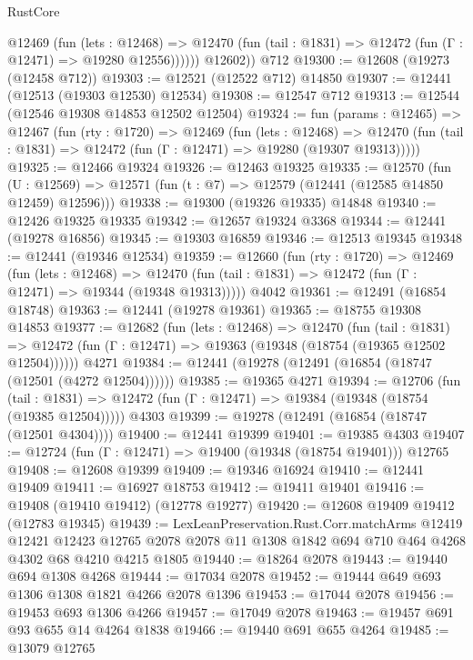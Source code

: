 \begin{lexlean}{RustCore}
\begin{coremodule}
            @12469
              (fun (lets : @12468) =>
              @12470 (fun (tail : @1831) => @12472 (fun (Γ : @12471) => @19280 @12556))))))
        @12602))
    @712
@19300 := @12608 (@19273 (@12458 @712))
@19303 := @12521 (@12522 @712) @14850
@19307 := @12441 (@12513 (@19303 @12530) @12534)
@19308 := @12547 @712
@19313 := @12544 (@12546 @19308 @14853 @12502 @12504)
@19324 := fun (params : @12465) =>
  @12467
    (fun (rty : @1720) =>
    @12469
      (fun (lets : @12468) =>
      @12470 (fun (tail : @1831) => @12472 (fun (Γ : @12471) => @19280 (@19307 @19313)))))
@19325 := @12466 @19324
@19326 := @12463 @19325
@19335 := @12570
    (fun (U : @12569) => @12571 (fun (t : @7) => @12579 (@12441 (@12585 @14850 @12459) @12596)))
@19338 := @19300 (@19326 @19335) @14848
@19340 := @12426 @19325 @19335
@19342 := @12657 @19324 @3368
@19344 := @12441 (@19278 @16856)
@19345 := @19303 @16859
@19346 := @12513 @19345
@19348 := @12441 (@19346 @12534)
@19359 := @12660
    (fun (rty : @1720) =>
    @12469
      (fun (lets : @12468) =>
      @12470 (fun (tail : @1831) => @12472 (fun (Γ : @12471) => @19344 (@19348 @19313)))))
    @4042
@19361 := @12491 (@16854 @18748)
@19363 := @12441 (@19278 @19361)
@19365 := @18755 @19308 @14853
@19377 := @12682
    (fun (lets : @12468) =>
    @12470
      (fun (tail : @1831) =>
      @12472 (fun (Γ : @12471) => @19363 (@19348 (@18754 (@19365 @12502 @12504))))))
    @4271
@19384 := @12441 (@19278 (@12491 (@16854 (@18747 (@12501 (@4272 @12504))))))
@19385 := @19365 @4271
@19394 := @12706
    (fun (tail : @1831) => @12472 (fun (Γ : @12471) => @19384 (@19348 (@18754 (@19385 @12504)))))
    @4303
@19399 := @19278 (@12491 (@16854 (@18747 (@12501 @4304))))
@19400 := @12441 @19399
@19401 := @19385 @4303
@19407 := @12724 (fun (Γ : @12471) => @19400 (@19348 (@18754 @19401))) @12765
@19408 := @12608 @19399
@19409 := @19346 @16924
@19410 := @12441 @19409
@19411 := @16927 @18753
@19412 := @19411 @19401
@19416 := @19408 (@19410 @19412) (@12778 @19277)
@19420 := @12608 @19409 @19412 (@12783 @19345)
@19439 := LexLeanPreservation.Rust.Corr.matchArms
    @12419
    @12421
    @12423
    @12765
    @2078
    @2078
    @11
    @1308
    @1842
    @694
    @710
    @464
    @4268
    @4302
    @68
    @4210
    @4215
    @1805
@19440 := @18264 @2078
@19443 := @19440 @694 @1308 @4268
@19444 := @17034 @2078
@19452 := @19444 @649 @693 @1306 @1308 @1821 @4266 @2078 @1396
@19453 := @17044 @2078
@19456 := @19453 @693 @1306 @4266
@19457 := @17049 @2078
@19463 := @19457 @691 @93 @655 @14 @4264 @1838
@19466 := @19440 @691 @655 @4264
@19485 := @13079
    @12765

\end{coremodule}
\end{lexlean}
